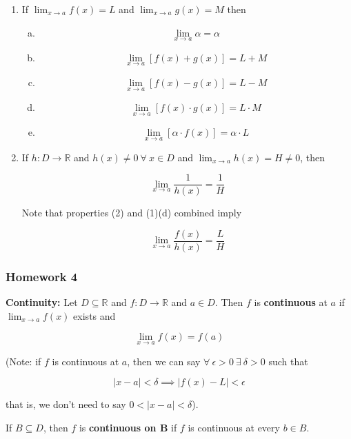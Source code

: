 \begin{enumerate}[(1)]

\item If \(\lim_{x \to a} f(x) = L\) and \(\lim_{x \to a} g(x) = M\) then

\begin{enumerate}[(a)]

\item \[\lim_{x \to a} \alpha = \alpha\]

\item \[\lim_{x \to a} [f(x) + g(x)] = L + M\]

\item \[\lim_{x \to a} [f(x) - g(x)] = L - M\]

\item \[\lim_{x \to a} [f(x) \cdot g(x)] = L \cdot M\]

\item \[\lim_{x \to a} [\alpha \cdot f(x)] = \alpha \cdot L\]

\end{enumerate}

\item If \(h:D \to \mathbb{R}\) and \(h(x) \neq 0 \ \forall \ x \in D\) and \(\lim_{x \to a} h(x) = H \neq 0\), then

\[
\lim_{x \to a} \frac{1}{h(x)} = \frac{1}{H}
\]

Note that properties (2) and (1)(d) combined imply

\[
\lim_{x \to a} \frac{f(x)}{h(x)} = \frac{L}{H}
\]

\end{enumerate}

\subsubsection{Homework 4}

\textbf{Continuity:} Let \(D \subseteq \mathbb{R}\) and \(f:D \to \mathbb{R}\) and \(a \in D\). Then \(f\) is \textbf{continuous} at \(a\) if \(\lim_{x \to a} f(x)\) exists and 

\[
\lim_{x \to a} f(x) = f(a)
\]

(Note: if \(f\) is continuous at \(a\), then we can say \(\forall \ \epsilon > 0 \ \exists \ \delta > 0 \) such that

\[
|x - a| < \delta \implies |f(x) - L| < \epsilon
\]

that is, we don't need to say \(0 < |x - a| < \delta\)).

If \(B \subseteq D\), then \(f\) is \textbf{continuous on B} if \(f\) is continuous at every \(b \in B\).

